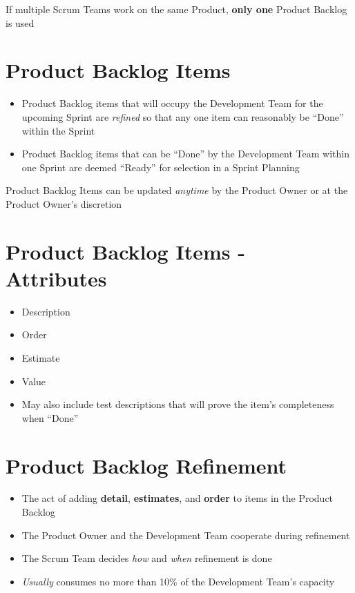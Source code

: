 \documentclass[a4paper,11pt,twocolumn]{article}
\begin{document}
\begin{tcolorbox}[colback=black!8!white,colframe=gray!50!black,title=Note,sharp corners,fonttitle=\normalsize\bfseries,fontupper=\normalsize,left=0.7em,right=0.7em]
	If multiple Scrum Teams work on the same Product, \textbf{only one} Product Backlog is used
\end{tcolorbox}

\section*{Product Backlog Items}
\begin{itemize}
	\item Product Backlog items that will occupy the Development Team for the upcoming Sprint are \textit{refined} so that any one item can reasonably be ``Done'' within the Sprint
    \item Product Backlog items that can be ``Done'' by the Development Team within one Sprint are deemed ``Ready'' for selection in a Sprint Planning
\end{itemize}

\begin{tcolorbox}[colback=black!8!white,colframe=gray!50!black,title=Note,sharp corners,fonttitle=\normalsize\bfseries,fontupper=\normalsize,left=0.7em,right=0.7em]
	Product Backlog Items can be updated \textit{anytime} by the Product Owner or at the Product Owner's discretion
\end{tcolorbox}

\section*{Product Backlog Items - Attributes}
\begin{itemize}
	\item Description
    \item Order
    \item Estimate
    \item Value
    \item May also include test descriptions that will prove the item's completeness when ``Done''
\end{itemize}

\section*{Product Backlog Refinement}
\begin{itemize}
	\item The act of adding \textbf{detail}, \textbf{estimates}, and \textbf{order} to items in the Product Backlog
	\item The Product Owner and the Development Team cooperate during refinement
	\item The Scrum Team decides \textit{how} and \textit{when} refinement is done
	\item \textit{Usually} consumes no more than 10\% of the Development Team's capacity
\end{itemize}
\end{document}
